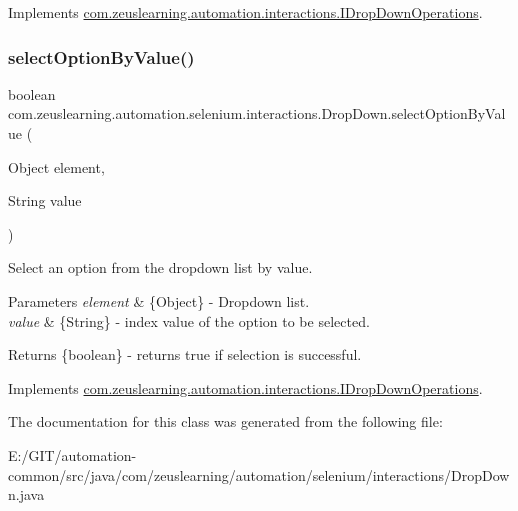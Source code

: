 Implements \hyperlink{interfacecom_1_1zeuslearning_1_1automation_1_1interactions_1_1IDropDownOperations_acab57addaabfe48b82367a8a5a605d8e}{com.\+zeuslearning.\+automation.\+interactions.\+I\+Drop\+Down\+Operations}.

\hypertarget{classcom_1_1zeuslearning_1_1automation_1_1selenium_1_1interactions_1_1DropDown_a192726c41689be2fd5ee44ad49262950}{}\label{classcom_1_1zeuslearning_1_1automation_1_1selenium_1_1interactions_1_1DropDown_a192726c41689be2fd5ee44ad49262950} 
\subsubsection{\texorpdfstring{select\+Option\+By\+Value()}{selectOptionByValue()}}
{\footnotesize\ttfamily boolean com.\+zeuslearning.\+automation.\+selenium.\+interactions.\+Drop\+Down.\+select\+Option\+By\+Value (\begin{DoxyParamCaption}\item[{Object}]{element,  }\item[{String}]{value }\end{DoxyParamCaption})\hspace{0.3cm}{\ttfamily [inline]}}

Select an option from the dropdown list by value.


\begin{DoxyParams}{Parameters}
{\em element} & \{Object\} -\/ Dropdown list. \\
\hline
{\em value} & \{String\} -\/ index value of the option to be selected.\\
\hline
\end{DoxyParams}
\begin{DoxyReturn}{Returns}
\{boolean\} -\/ returns {\ttfamily true} if selection is successful. 
\end{DoxyReturn}


Implements \hyperlink{interfacecom_1_1zeuslearning_1_1automation_1_1interactions_1_1IDropDownOperations_aa8d8cc39ebf833405a20ff1966d07b6b}{com.\+zeuslearning.\+automation.\+interactions.\+I\+Drop\+Down\+Operations}.



The documentation for this class was generated from the following file\+:\begin{DoxyCompactItemize}
\item 
E\+:/\+G\+I\+T/automation-\/common/src/java/com/zeuslearning/automation/selenium/interactions/Drop\+Down.\+java\end{DoxyCompactItemize}
